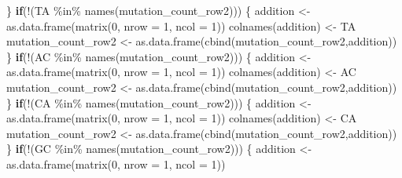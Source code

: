 \documentclass[
]{article}
\newenvironment{Shaded}{\begin{snugshade}}{\end{snugshade}}
\newcommand{\AttributeTok}[1]{\textcolor[rgb]{0.77,0.63,0.00}{#1}}
\newcommand{\ControlFlowTok}[1]{\textcolor[rgb]{0.13,0.29,0.53}{\textbf{#1}}}
\newcommand{\DecValTok}[1]{\textcolor[rgb]{0.00,0.00,0.81}{#1}}
\newcommand{\FunctionTok}[1]{\textcolor[rgb]{0.00,0.00,0.00}{#1}}
\newcommand{\NormalTok}[1]{#1}
\newcommand{\OtherTok}[1]{\textcolor[rgb]{0.56,0.35,0.01}{#1}}
\newcommand{\SpecialCharTok}[1]{\textcolor[rgb]{0.00,0.00,0.00}{#1}}
\newcommand{\StringTok}[1]{\textcolor[rgb]{0.31,0.60,0.02}{#1}}
\begin{document}
\begin{Shaded}
\begin{Highlighting}[]
\NormalTok{  \}}
  \ControlFlowTok{if}\NormalTok{(}\SpecialCharTok{!}\NormalTok{(}\StringTok{\textquotesingle{}TA\textquotesingle{}} \SpecialCharTok{\%in\%} \FunctionTok{names}\NormalTok{(mutation\_count\_row2)))}
\NormalTok{  \{}
\NormalTok{    addition }\OtherTok{\textless{}{-}} \FunctionTok{as.data.frame}\NormalTok{(}\FunctionTok{matrix}\NormalTok{(}\DecValTok{0}\NormalTok{, }\AttributeTok{nrow =} \DecValTok{1}\NormalTok{, }\AttributeTok{ncol =} \DecValTok{1}\NormalTok{))}
    \FunctionTok{colnames}\NormalTok{(addition) }\OtherTok{\textless{}{-}} \StringTok{\textquotesingle{}TA\textquotesingle{}}
\NormalTok{    mutation\_count\_row2 }\OtherTok{\textless{}{-}} \FunctionTok{as.data.frame}\NormalTok{(}\FunctionTok{cbind}\NormalTok{(mutation\_count\_row2,addition))}
\NormalTok{  \}}
  \ControlFlowTok{if}\NormalTok{(}\SpecialCharTok{!}\NormalTok{(}\StringTok{\textquotesingle{}AC\textquotesingle{}} \SpecialCharTok{\%in\%} \FunctionTok{names}\NormalTok{(mutation\_count\_row2)))}
\NormalTok{  \{}
\NormalTok{    addition }\OtherTok{\textless{}{-}} \FunctionTok{as.data.frame}\NormalTok{(}\FunctionTok{matrix}\NormalTok{(}\DecValTok{0}\NormalTok{, }\AttributeTok{nrow =} \DecValTok{1}\NormalTok{, }\AttributeTok{ncol =} \DecValTok{1}\NormalTok{))}
    \FunctionTok{colnames}\NormalTok{(addition) }\OtherTok{\textless{}{-}} \StringTok{\textquotesingle{}AC\textquotesingle{}}
\NormalTok{    mutation\_count\_row2 }\OtherTok{\textless{}{-}} \FunctionTok{as.data.frame}\NormalTok{(}\FunctionTok{cbind}\NormalTok{(mutation\_count\_row2,addition))}
\NormalTok{  \}}
  \ControlFlowTok{if}\NormalTok{(}\SpecialCharTok{!}\NormalTok{(}\StringTok{\textquotesingle{}CA\textquotesingle{}} \SpecialCharTok{\%in\%} \FunctionTok{names}\NormalTok{(mutation\_count\_row2)))}
\NormalTok{  \{}
\NormalTok{    addition }\OtherTok{\textless{}{-}} \FunctionTok{as.data.frame}\NormalTok{(}\FunctionTok{matrix}\NormalTok{(}\DecValTok{0}\NormalTok{, }\AttributeTok{nrow =} \DecValTok{1}\NormalTok{, }\AttributeTok{ncol =} \DecValTok{1}\NormalTok{))}
    \FunctionTok{colnames}\NormalTok{(addition) }\OtherTok{\textless{}{-}} \StringTok{\textquotesingle{}CA\textquotesingle{}}
\NormalTok{    mutation\_count\_row2 }\OtherTok{\textless{}{-}} \FunctionTok{as.data.frame}\NormalTok{(}\FunctionTok{cbind}\NormalTok{(mutation\_count\_row2,addition))}
\NormalTok{  \}}
  \ControlFlowTok{if}\NormalTok{(}\SpecialCharTok{!}\NormalTok{(}\StringTok{\textquotesingle{}GC\textquotesingle{}} \SpecialCharTok{\%in\%} \FunctionTok{names}\NormalTok{(mutation\_count\_row2)))}
\NormalTok{  \{}
\NormalTok{    addition }\OtherTok{\textless{}{-}} \FunctionTok{as.data.frame}\NormalTok{(}\FunctionTok{matrix}\NormalTok{(}\DecValTok{0}\NormalTok{, }\AttributeTok{nrow =} \DecValTok{1}\NormalTok{, }\AttributeTok{ncol =} \DecValTok{1}\NormalTok{))}

\end{Highlighting}
\end{Shaded}
\end{document}
